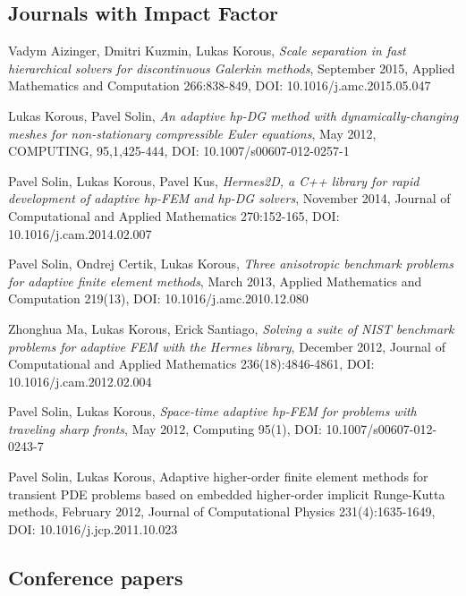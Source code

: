 \subsection*{Journals with Impact Factor}
\begin{enumerate}[label={[\arabic*]}]
\item
Vadym Aizinger, Dmitri Kuzmin, Lukas Korous, \textit{Scale separation in fast hierarchical solvers for discontinuous Galerkin methods}, September 2015, Applied Mathematics and Computation 266:838-849, DOI: 10.1016/j.amc.2015.05.047

\item
Lukas Korous, Pavel Solin, \textit{An adaptive hp-DG method with dynamically-changing meshes for non-stationary compressible Euler equations}, May 2012, COMPUTING, 95,1,425-444, DOI: 10.1007/s00607-012-0257-1

\item
Pavel Solin, Lukas Korous, Pavel Kus, \textit{Hermes2D, a C++ library for rapid development of adaptive hp-FEM and hp-DG solvers}, November 2014, Journal of Computational and Applied Mathematics 270:152-165, DOI: 10.1016/j.cam.2014.02.007

\item
Pavel Solin, Ondrej Certik, Lukas Korous, \textit{Three anisotropic benchmark problems for adaptive finite element methods}, March 2013, Applied Mathematics and Computation 219(13), DOI: 10.1016/j.amc.2010.12.080

\item
Zhonghua Ma, Lukas Korous, Erick Santiago, \textit{Solving a suite of NIST benchmark problems for adaptive FEM with the Hermes library}, December 2012, Journal of Computational and Applied Mathematics 236(18):4846-4861, DOI: 10.1016/j.cam.2012.02.004

\item
Pavel Solin, Lukas Korous, \textit{Space-time adaptive hp-FEM for problems with traveling sharp fronts}, May 2012, Computing 95(1), DOI: 10.1007/s00607-012-0243-7

\item
Pavel Solin, Lukas Korous, Adaptive higher-order finite element methods for transient PDE problems based on embedded higher-order implicit Runge-Kutta methods, February 2012, Journal of Computational Physics 231(4):1635-1649, DOI: 10.1016/j.jcp.2011.10.023
\end{enumerate}

\subsection*{Conference papers}

